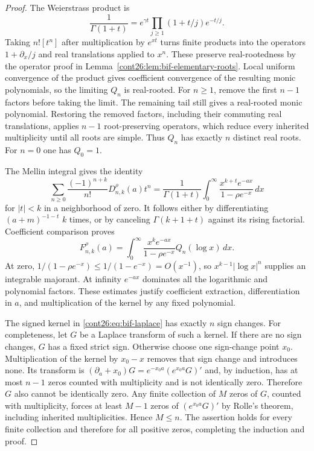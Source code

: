 \documentclass[11pt,letterpaper]{article}
\numberwithin{equation}{section}
\theoremstyle{plain}
\theoremstyle{definition}
\theoremstyle{remark}
\begin{document}
\begin{proof}
The Weierstrass product is
\[
 \frac1{\Gamma(1+t)}=e^{\gamma t}
             \prod_{j\geq1}(1+t/j)e^{-t/j}.
\]
Taking $n![t^n]$ after multiplication by $e^{xt}$ turns finite products
into the operators $1+\partial_x/j$ and real translations applied to
$x^n$. These preserve real-rootedness by the operator proof in
Lemma~\ref{cont26:lem:bif-elementary-roots}. Local uniform convergence of the
product gives coefficient convergence of the resulting monic polynomials,
so the limiting $Q_n$ is real-rooted. For $n\geq1$, remove the first
$n-1$ factors before taking the limit. The remaining tail still gives
a real-rooted monic polynomial. Restoring the removed factors, including
their commuting real translations, applies $n-1$ root-preserving
operators, which reduce every inherited multiplicity until all roots
are simple. Thus $Q_n$ has exactly $n$ distinct real roots. For $n=0$
one has $Q_0=1$.

The Mellin integral gives the identity
\[
 \sum_{n\geq0}\frac{(-1)^{n+k}}{n!}D_{n,k}^{\rho}(a)t^n
   =\frac1{\Gamma(1+t)}\int_0^\infty
                   \frac{x^{k+t}e^{-ax}}{1-\rho e^{-x}}\,dx
\]
for $|t|<k$ in a neighborhood of zero. It follows either by
differentiating $(a+m)^{-1-t}$ $k$ times, or by canceling
$\Gamma(k+1+t)$ against its rising factorial. Coefficient comparison
proves
\begin{equation}\label{cont26:eq:bif-laplace}
 F_{n,k}^{\rho}(a)=\int_0^\infty
       \frac{x^ke^{-ax}}{1-\rho e^{-x}}Q_n(\log x)\,dx.
\end{equation}
At zero, $1/(1-\rho e^{-x})\leq1/(1-e^{-x})=O(x^{-1})$,
so $x^{k-1}|\log x|^n$ supplies an integrable majorant. At infinity
$e^{-ax}$ dominates all the logarithmic and polynomial factors.
These estimates justify coefficient extraction, differentiation in $a$,
and multiplication of the kernel by any fixed polynomial.

The signed kernel in \eqref{cont26:eq:bif-laplace} has exactly $n$ sign changes.
For completeness, let $G$ be a Laplace transform of such a kernel.
If there are no sign changes, $G$ has a fixed strict sign. Otherwise
choose one sign-change point $x_0$. Multiplication of the kernel by
$x_0-x$ removes that sign change and introduces none. Its transform is
$(\partial_a+x_0)G=e^{-x_0a}(e^{x_0a}G)'$ and, by induction, has at
most $n-1$ zeros counted with multiplicity and is not identically zero.
Therefore $G$ also cannot be identically zero. Any finite collection of
$M$ zeros of $G$, counted with multiplicity, forces at least $M-1$ zeros
of $(e^{x_0a}G)'$ by Rolle's theorem, including inherited multiplicities.
Hence $M\leq n$. The assertion holds for every finite collection and
therefore for all positive zeros, completing the induction and proof.
\end{proof}
\end{document}
